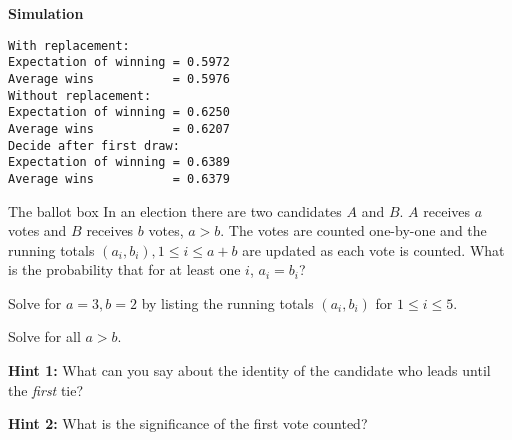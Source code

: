 \textbf{Simulation}
\begin{verbatim}
With replacement:
Expectation of winning = 0.5972
Average wins           = 0.5976
Without replacement:
Expectation of winning = 0.6250
Average wins           = 0.6207
Decide after first draw:
Expectation of winning = 0.6389
Average wins           = 0.6379
\end{verbatim}




\begin{prob}{The ballot box}
In an election there are two candidates $A$ and $B$.  $A$ receives $a$ votes and $B$ receives $b$ votes, $a>b$. The votes are counted one-by-one and the running totals $(a_i,b_i), 1\leq i \leq a+b$ are updated as each vote is counted. What is the probability that for at least one $i$, $a_i=b_i$?

 Solve for $a=3, b=2$ by listing the running totals $(a_i,b_i)$ for $1\leq i\leq 5$.

 Solve for all $a>b$.

\textbf{Hint 1:} What can you say about the identity of the candidate who leads until the \emph{first} tie?

\textbf{Hint 2:} What is the significance of the first vote counted?
\end{prob}

\solution{}

